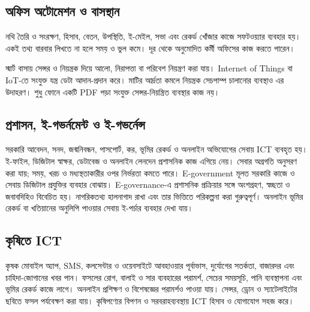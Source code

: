 \begin{topicbody}
\subsection{অফিস অটোমেশন ও বাসস্থান}
নথি তৈরি ও সংরক্ষণ, হিসাব, বেতন, উপস্থিতি, ই-মেইল, সভা এবং রেকর্ড খোঁজার কাজে সফটওয়্যার ব্যবহার হয়। একই তথ্য বারবার লিখতে না হলে সময় ও ভুল কমে। দূর থেকে অনুমোদিত কর্মী অফিসের কাজ করতে পারেন।

স্মার্ট বাসায় সেন্সর ও নিয়ন্ত্রক দিয়ে আলো, নিরাপত্তা বা পরিবেশ নিয়ন্ত্রণ করা যায়। Internet of Things বা IoT-তে সংযুক্ত যন্ত্র ডেটা আদান-প্রদান করে। মাটির আর্দ্রতা কমলে নিয়ন্ত্রক সেচপাম্প চালানোর ব্যবস্থাও এর উদাহরণ। শুধু ফোনে একটি PDF পড়া সংযুক্ত সেন্সর-নিয়ন্ত্রিত ব্যবস্থার কাজ নয়।

\subsection{প্রশাসন, ই-গভর্নমেন্ট ও ই-গভর্নেন্স}
সরকারি আবেদন, সনদ, জন্মনিবন্ধন, পাসপোর্ট, কর, ভূমির রেকর্ড ও অনলাইন অভিযোগের সেবায় ICT ব্যবহৃত হয়। ই-ফাইল, ডিজিটাল স্বাক্ষর, ডেটাবেজ ও অনলাইন লেনদেন প্রশাসনিক কাজ এগিয়ে নেয়। সেবার অগ্রগতি অনুসরণ করা যায়; সময়, খরচ ও মধ্যস্থতাকারীর ওপর নির্ভরতা কমতে পারে।
E-government মূলত সরকারি কাজে ও সেবায় ডিজিটাল প্রযুক্তির ব্যবহার বোঝায়। E-governance-এ প্রশাসনিক প্রক্রিয়ার সঙ্গে অংশগ্রহণ, স্বচ্ছতা ও জবাবদিহিও বিবেচিত হয়। নাগরিকতথ্য হালনাগাদ রাখা এবং তার ভিত্তিতে পরিকল্পনা করা গুরুত্বপূর্ণ। অনলাইন ভূমির রেকর্ড বা খতিয়ানের অনুলিপি পাওয়ার সেবায় ই-পর্চার ব্যবহার দেখা যায়।

\subsection{কৃষিতে ICT}
কৃষক মোবাইল অ্যাপ, SMS, কলসেন্টার ও ওয়েবসাইটে আবহাওয়ার পূর্বাভাস, দুর্যোগের সতর্কতা, বাজারদর এবং চাহিদা-জোগানের খবর পান। ফসলের রোগ, বালাই ও সার ব্যবহারের পরামর্শ, সেচের সময়সূচি, পানি ব্যবস্থাপনা এবং ভূমির রেকর্ড কাজে লাগে। অনলাইন প্রশিক্ষণ ও বিশেষজ্ঞের পরামর্শও পাওয়া যায়। সেন্সর, ড্রোন ও স্যাটেলাইটের ছবিতে ফসল পর্যবেক্ষণ করা যায়। কৃষিপণ্যের বিপণন ও সরবরাহব্যবস্থায় ICT হিসাব ও যোগাযোগ সহজ করে।


\end{topicbody}
